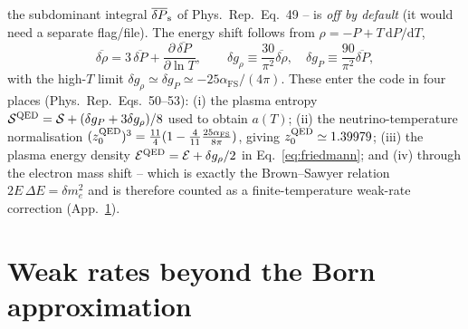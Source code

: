 \documentclass[11pt,a4paper]{article}
\newcommand{\dd}{\mathrm{d}}
\newcommand{\PR}{Phys.\ Rep.}
\newcommand{\afs}{\alpha_{\mathrm{FS}}}
\begin{document}
the subdominant integral $\overline{\delta P}_{\rm s}$ of \PR\ Eq.~49 -- is
\emph{off by default} (it would need a separate flag/file). The energy shift
follows from $\rho=-P+T\,\dd P/\dd T$,
\begin{equation}
  \overline{\delta\rho} = 3\,\overline{\delta P}
     + \frac{\partial\,\overline{\delta P}}{\partial\ln T},
  \qquad
  \delta g_\rho \equiv \frac{30}{\pi^2}\overline{\delta\rho},\quad
  \delta g_P \equiv \frac{90}{\pi^2}\overline{\delta P},
\end{equation}
with the high-$T$ limit $\delta g_\rho\simeq\delta g_P\simeq-25\afs/(4\pi)$. These
enter the code in four places (\PR\ Eqs.~50--53): (i) the plasma entropy
$\mathcal{S}^{\rm QED}=\mathcal{S}+(\delta g_P+3\delta g_\rho)/8$ used to obtain
$a(T)$; (ii) the neutrino-temperature normalisation
$(z_0^{\rm QED})^3=\tfrac{11}{4}(1-\tfrac{4}{11}\tfrac{25\afs}{8\pi})$, giving
$z_0^{\rm QED}\simeq1.39979$; (iii) the plasma energy density
$\mathcal{E}^{\rm QED}=\mathcal{E}+\delta g_\rho/2$ in
Eq.~\eqref{eq:friedmann}; and (iv) through the electron mass shift -- which is
exactly the Brown--Sawyer relation $2E\,\Delta E=\delta m_e^2$ and is therefore
counted as a finite-temperature weak-rate correction (App.~\ref{app:weak}).

\section{Weak rates beyond the Born approximation}\label{app:weak}
\end{document}

